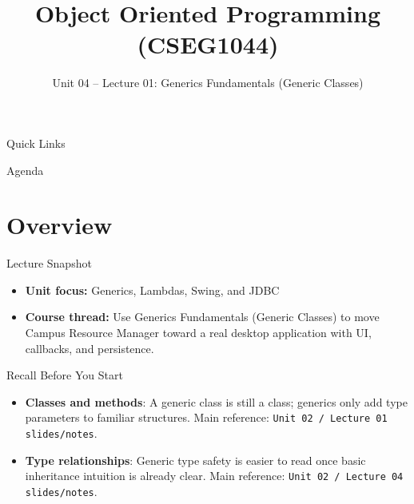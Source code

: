 \documentclass{beamer}
\title[OOPS with Java]{Object Oriented Programming (CSEG1044)}
\subtitle{Unit 04 -- Lecture 01: Generics Fundamentals (Generic Classes)}
\begin{document}
\begin{frame}[fragile]
  \titlepage
  \vspace{0.5em}
  \slidesources{\OOPSUnitIVSources}
\end{frame}

\begin{frame}{Quick Links}
  \centering
  \hyperlink{sec:overview}{}\hspace{0.6em}
  \hyperlink{sec:concepts}{}\hspace{0.6em}
  \hyperlink{sec:demo}{}\hspace{0.6em}
  \hyperlink{sec:summary}{}
  \slidesources{\OOPSUnitIVSources}
\end{frame}

\begin{frame}{Agenda}
  \tableofcontents
  \slidesources{\OOPSUnitIVSources}
\end{frame}

\section{Overview}
\label{sec:overview}

\begin{frame}{Lecture Snapshot}
\begin{itemize}[<+->]
  \item \textbf{Unit focus:} Generics, Lambdas, Swing, and JDBC
  \item \textbf{Course thread:} Use Generics Fundamentals (Generic Classes) to move Campus Resource Manager toward a real desktop application with UI, callbacks, and persistence.
\end{itemize}
  \slidesources{\OOPSUnitIVSources}
\end{frame}

\begin{frame}{Recall Before You Start}
\begin{itemize}[<+->]
  \item \textbf{Classes and methods}: A generic class is still a class; generics only add type parameters to familiar structures. Main reference: \texttt{Unit 02 / Lecture 01 slides/notes}.
  \item \textbf{Type relationships}: Generic type safety is easier to read once basic inheritance intuition is already clear. Main reference: \texttt{Unit 02 / Lecture 04 slides/notes}.
\end{itemize}
  \slidesources{\OOPSUnitIVSources}
\end{frame}
\end{document}
